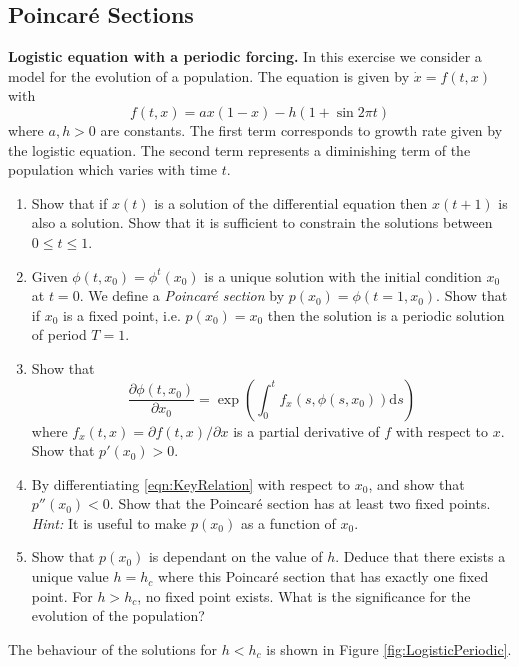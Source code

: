 \documentclass{article}
\newcommand{\diff}{\text{d}}
\begin{document}
\subsection*{Poincar\'e Sections}
\begin{question} \textbf{Logistic equation with a periodic forcing.} In this exercise we consider a model for the evolution of a population. The equation is given by $\dot x = f(t,x)$ with
\begin{equation}
  f(t,x) = a x(1-x) -h(1+\sin 2\pi t)
\end{equation}
where $a,h>0$ are constants. The first term corresponds to growth rate given by the logistic equation. The second term represents a diminishing term of the population which varies with time $t$.

\begin{enumerate}[label=(\alph*)]
  \item Show that if $x(t)$ is a solution of the differential equation then $x(t+1)$ is also a solution. Show that it is sufficient to constrain the solutions between $0 \leqslant t \leqslant 1$.
  \item Given $\phi(t,x_0) = \phi^t(x_0)$ is a unique solution with the initial condition $x_0$ at $t=0$. We define a \textit{Poincar\'e section} by $p(x_0) = \phi(t=1,x_0)$. Show that if $x_0$ is a fixed point, i.e. $p(x_0) = x_0$ then the solution is a periodic solution of period $T=1$.
  \item Show that
  \begin{equation}
    \label{eqn:KeyRelation}
    \frac{\partial \phi(t,x_0)}{\partial x_0} = \exp\left(\int_0^t f_x(s,\phi(s,x_0))\diff s\right)
  \end{equation}
  where $f_x(t,x) = \partial f(t,x)/\partial x$ is a partial derivative of $f$ with respect to $x$. Show that $p'(x_0)>0$.
  \item By differentiating \eqref{eqn:KeyRelation} with respect to $x_0$, and show that $p''(x_0) < 0$. Show that the Poincar\'e section has at least two fixed points. \textit{Hint: } It is useful to make $p(x_0)$ as a function of $x_0$.
  \item Show that $p(x_0)$ is dependant on the value of $h$. Deduce that there exists a unique value $h=h_c$ where this Poincar\'e section that has exactly one fixed point. For $h>h_c$, no fixed point exists. What is the significance for the evolution of the population?
\end{enumerate}
The behaviour of the solutions for $h<h_c$ is shown in Figure \ref{fig:LogisticPeriodic}. 


\end{question}
\end{document}
